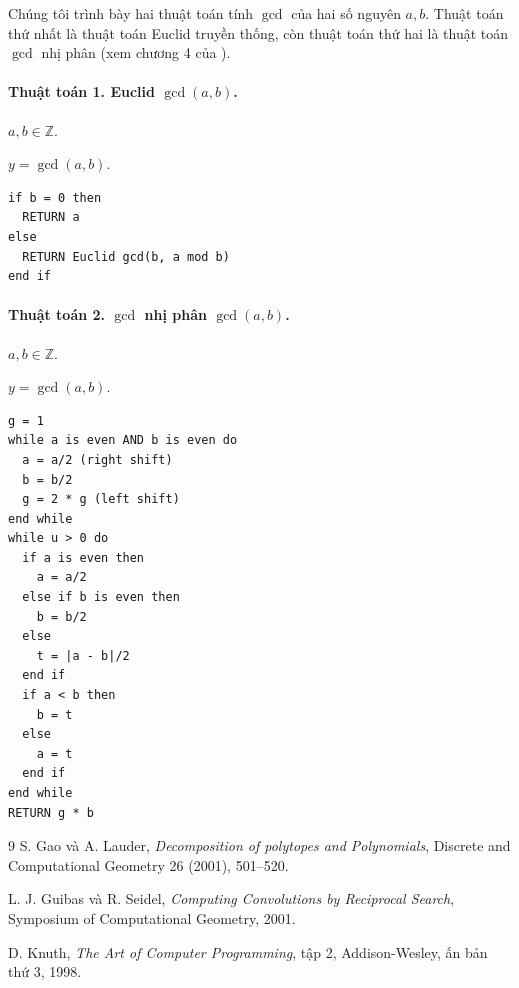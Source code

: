 \documentclass[11pt]{article}
\begin{document}
Chúng tôi trình bày hai thuật toán tính \(\gcd\) của hai số nguyên \(a,b\).
Thuật toán thứ nhất là thuật toán Euclid truyền thống, còn thuật toán thứ hai
là thuật toán \(\gcd\) nhị phân (xem chương 4 của \cite{knuth}).

\paragraph{Thuật toán 1. Euclid \(\gcd(a,b)\).}
\begin{description}[leftmargin=7em,style=nextline]
  \item[Yêu cầu:] \(a,b\in\mathbb Z\).
  \item[Bảo đảm:] \(y=\gcd(a,b)\).
\end{description}
\begin{verbatim}
if b = 0 then
  RETURN a
else
  RETURN Euclid gcd(b, a mod b)
end if
\end{verbatim}

\paragraph{Thuật toán 2. \(\gcd\) nhị phân \(\gcd(a,b)\).}
\begin{description}[leftmargin=7em,style=nextline]
  \item[Yêu cầu:] \(a,b\in\mathbb Z\).
  \item[Bảo đảm:] \(y=\gcd(a,b)\).
\end{description}
\begin{verbatim}
g = 1
while a is even AND b is even do
  a = a/2 (right shift)
  b = b/2
  g = 2 * g (left shift)
end while
while u > 0 do
  if a is even then
    a = a/2
  else if b is even then
    b = b/2
  else
    t = |a - b|/2
  end if
  if a < b then
    b = t
  else
    a = t
  end if
end while
RETURN g * b
\end{verbatim}

\begin{thebibliography}{9}
S. Gao và A. Lauder,
\textit{Decomposition of polytopes and Polynomials},
Discrete and Computational Geometry 26 (2001), 501--520.

L. J. Guibas và R. Seidel,
\textit{Computing Convolutions by Reciprocal Search},
Symposium of Computational Geometry, 2001.

D. Knuth,
\textit{The Art of Computer Programming}, tập 2,
Addison-Wesley, ấn bản thứ 3, 1998.
\end{thebibliography}
\end{document}
